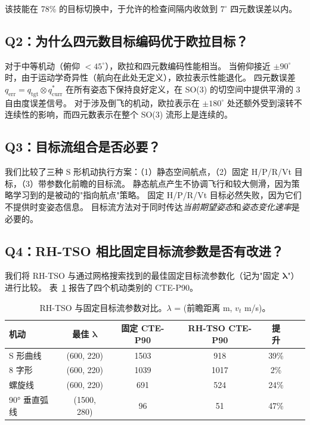 \documentclass{article}
\begin{document}
该技能在 78\% 的目标切换中，于允许的检查间隔内收敛到 $7^\circ$ 四元数误差以内。

\subsection{Q2：为什么四元数目标编码优于欧拉目标？}

对于中等机动（俯仰 $< 45^\circ$），欧拉和四元数编码性能相当。
当俯仰接近 $\pm90^\circ$ 时，由于运动学奇异性（航向在此处无定义），欧拉表示性能退化。
四元数误差 $q_{\text{err}} = q_{\text{tgt}} \otimes q_{\text{curr}}^*$ 在所有姿态下保持良好定义，在 SO(3) 的切空间中提供平滑的 3 自由度误差信号。
对于涉及倒飞的机动，欧拉表示在 $\pm180^\circ$ 处还额外受到滚转不连续性的影响，而四元数表示在整个 SO(3) 流形上是连续的。

\subsection{Q3：目标流组合是否必要？}

我们比较了三种 S 形机动执行方案：（1）静态空间航点，（2）固定 H/P/R/Vt 目标，（3）带参数化前瞻的目标流。
静态航点产生不协调飞行和较大侧滑，因为策略学习到的是被动的"指向航点"策略。
固定 H/P/R/Vt 目标必然失败，因为它们不提供时变姿态信息。
目标流方法对于同时传达\emph{当前期望姿态}和\emph{姿态变化速率}是必要的。

\subsection{Q4：RH-TSO 相比固定目标流参数是否有改进？}

我们将 RH-TSO 与通过网格搜索找到的最佳固定目标流参数化（记为"固定 $\bm{\lambda}$"）进行比较。
表~\ref{tab:rhtso} 报告了四个机动类别的 CTE-P90。

\begin{table}[t]
\caption{RH-TSO 与固定目标流参数对比。$\lambda$ = (前瞻距离 m, $v_t$ m/s)。}
\label{tab:rhtso}
\centering
\begin{tabular}{lcccccc}
  \hline
  \textbf{机动} & \textbf{最佳 $\bm{\lambda}$} & \textbf{固定 CTE-P90} & \textbf{RH-TSO CTE-P90} & \textbf{提升} \\
  \hline
  S 形曲线   & (600, 220)  & 1503 & 918  & 39\% \\
  8 字形     & (600, 220)  & 1039 & 1017 & 2\%  \\
  螺旋线     & (600, 220)  & 691  & 524  & 24\% \\
  90° 垂直弧线 & (1500, 280) & 96   & 51   & 47\% \\
  \hline
\end{tabular}
\end{table}
\end{document}
